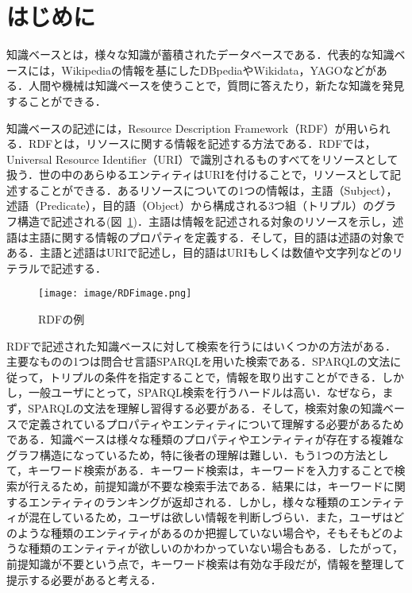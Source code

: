 \section{はじめに}
\label{sec:introduction}
知識ベースとは，様々な知識が蓄積されたデータベースである．代表的な知識ベースには，Wikipediaの情報を基にしたDBpediaやWikidata，YAGOなどがある．人間や機械は知識ベースを使うことで，質問に答えたり，新たな知識を発見することができる．

知識ベースの記述には，Resource Description Framework（RDF）が用いられる．RDFとは，リソースに関する情報を記述する方法である．RDFでは，Universal Resource Identifier（URI）で識別されるものすべてをリソースとして扱う．世の中のあらゆるエンティティはURIを付けることで，リソースとして記述することができる．あるリソースについての1つの情報は，主語（Subject），述語（Predicate），目的語（Object）から構成される3つ組（トリプル）のグラフ構造で記述される(図~\ref{fig:RDFimage})．主語は情報を記述される対象のリソースを示し，述語は主語に関する情報のプロパティを定義する．そして，目的語は述語の対象である．主語と述語はURIで記述し，目的語はURIもしくは数値や文字列などのリテラルで記述する．
%
\begin{figure}[h]
\centering
\texttt{[image: image/RDFimage.png]}
\caption{\small
RDFの例
}
\label{fig:RDFimage}
\end{figure}
%

RDFで記述された知識ベースに対して検索を行うにはいくつかの方法がある．主要なものの1つは問合せ言語SPARQLを用いた検索である．SPARQLの文法に従って，トリプルの条件を指定することで，情報を取り出すことができる．しかし，一般ユーザにとって，SPARQL検索を行うハードルは高い．なぜなら，まず，SPARQLの文法を理解し習得する必要がある．そして，検索対象の知識ベースで定義されているプロパティやエンティティについて理解する必要があるためである．知識ベースは様々な種類のプロパティやエンティティが存在する複雑なグラフ構造になっているため，特に後者の理解は難しい．もう1つの方法として，キーワード検索がある．キーワード検索は，キーワードを入力することで検索が行えるため，前提知識が不要な検索手法である．結果には，キーワードに関するエンティティのランキングが返却される．しかし，様々な種類のエンティティが混在しているため，ユーザは欲しい情報を判断しづらい．また，ユーザはどのような種類のエンティティがあるのか把握していない場合や，そもそもどのような種類のエンティティが欲しいのかわかっていない場合もある．したがって，前提知識が不要という点で，キーワード検索は有効な手段だが，情報を整理して提示する必要があると考える．

